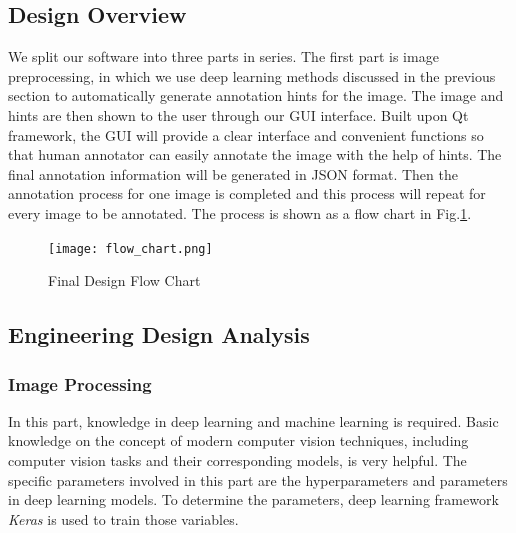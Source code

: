 \subsection{Design Overview}
We split our software into three parts in series. The first part is image preprocessing, in which we use deep learning methods discussed in the previous section to automatically generate annotation hints for the image. The image and hints are then shown to the user through our GUI interface. Built upon Qt framework, the GUI will provide a clear interface and convenient functions so that human annotator can easily annotate the image with the help of hints. The final annotation information will be generated in JSON format. Then the annotation process for one image is completed and this process will repeat for every image to be annotated. The process is shown as a flow chart in Fig.\ref{fig:FlowChart}.


\begin{figure}[h!]
  \centering \texttt{[image: flow\_chart.png]}
  \caption{Final Design Flow Chart}
  \label{fig:FlowChart}
\end{figure}


\subsection{Engineering Design Analysis}
\subsubsection{Image Processing}
In this part, knowledge in deep learning and machine learning is required. Basic knowledge on the concept of modern computer vision techniques, including computer vision tasks and their corresponding models, is very helpful. The specific parameters involved in this part are the hyperparameters and parameters in deep learning models. To determine the parameters, deep learning framework \textit{Keras} is used to train those variables.

